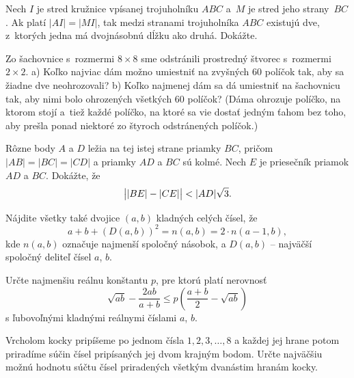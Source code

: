 {%
Nech $I$ je stred kružnice vpísanej trojuholníku $ABC$ a~$M$ je stred jeho strany~$BC$. Ak platí $|AI|=|MI|$, tak
medzi stranami trojuholníka $ABC$ existujú dve, z~ktorých jedna má dvojnásobnú dĺžku ako druhá. Dokážte.
}

{%
Zo šachovnice s~rozmermi $8\times8$ sme odstránili prostredný štvorec s~rozmermi $2\times2$.
\ite a) Koľko najviac dám možno umiestniť na zvyšných 60 políčok tak, aby sa žiadne dve neohrozovali?
\ite b) Koľko najmenej dám sa dá umiestniť na šachovnicu tak, aby nimi bolo ohrozených všetkých 60 políčok?
\endgraf\noindent
(Dáma ohrozuje políčko, na ktorom stojí a~tiež každé políčko, na ktoré sa vie dostať jedným ťahom bez toho, aby prešla ponad niektoré zo štyroch odstránených políčok.)
}

{%
Rôzne body $A$ a $D$ ležia na tej istej strane priamky $BC$, pričom $|AB| = |BC| = |CD|$ a priamky $AD$ a $BC$ sú kolmé. Nech $E$ je priesečník priamok $AD$ a $BC$. Dokážte, že
$$
\bigl| |BE| - |CE|\bigr| < |AD|\sqrt3.
\postdisplaypenalty=10000
$$}

{%
Nájdite všetky také dvojice $(a,b)$ kladných celých čísel, že
$$
a+b+(D(a,b))^2=n(a,b)= 2\cdot n(a-1,b),
$$
kde $n(a,b)$ označuje najmenší spoločný násobok, a $D(a, b)$ -- najväčší spoločný
deliteľ čísel $a$, $b$.}

{%
Určte najmenšiu reálnu konštantu $p$, pre ktorú platí nerovnosť
$$
\sqrt{ab}-\frac{2ab}{a+b} \leq p\left(\frac{a+b}2-\sqrt{ab}\right)
$$
s ľubovoľnými kladnými reálnymi číslami $a$, $b$.
}

{%
Vrcholom kocky pripíšeme po jednom čísla $1,2,3,\dots ,8$ a každej jej hrane potom priradíme súčin čísel pripísaných jej
dvom krajným bodom. Určte najväčšiu možnú hodnotu súčtu čísel priradených všetkým dvanástim hranám kocky.
}
